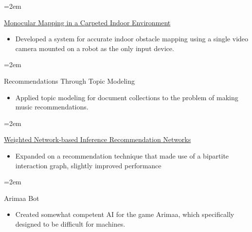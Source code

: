 \documentclass[a4paper]{scrartcl}
\newcommand{\NewSectionHeading}[1]{\noindent\color{blue}\spacedlowsmallcaps{#1}\vspace{1em}\color{Black}} %
\newcommand{\Description}[1]{\hangindent=2em\hangafter=0\noindent\raggedright\footnotesize{#1}\par\normalsize\vspace{1em}} %
\begin{document}
\begin{cv}{}

\NewSectionHeading{Cool Projects}

\Description{\href{http://www.cs.cornell.edu/Courses/cs4758/2013sp/final\%20project/hung_dang.pdf}{Monocular Mapping in a Carpeted Indoor Environment}
\begin{itemize}
\newcommand{\localtextbulletone}{\textcolor{blue}{\raisebox{0.40ex}{\rule{.6ex}{.6ex}}}}
\renewcommand{\labelitemi}{\localtextbulletone}
    \item Developed a system for accurate indoor obstacle mapping using a single video camera mounted on a robot as the only input device.
\end{itemize}}

\vspace{-0.5em} %

\Description{Recommendations Through Topic Modeling
\begin{itemize}
\newcommand{\localtextbulletone}{\textcolor{blue}{\raisebox{0.40ex}{\rule{.6ex}{.6ex}}}}
\renewcommand{\labelitemi}{\localtextbulletone}
    \item Applied topic modeling for document collections to the problem of making music recommendations.
\end{itemize}}

\vspace{-0.5em} %

\Description{\href{http://sohanjain.com/portfolio/jain-terkelsen-hundal-network-based-inference/}{Weighted Network-based Inference Recommendation Networks}
\begin{itemize}
\newcommand{\localtextbulletone}{\textcolor{blue}{\raisebox{0.40ex}{\rule{.6ex}{.6ex}}}}
\renewcommand{\labelitemi}{\localtextbulletone}
    \item Expanded on a recommendation technique that made use of a bipartite interaction graph, slightly improved performance
\end{itemize}}

\vspace{-0.5em} %

\Description{Arimaa Bot
\begin{itemize}
\newcommand{\localtextbulletone}{\textcolor{blue}{\raisebox{0.40ex}{\rule{.6ex}{.6ex}}}}
\renewcommand{\labelitemi}{\localtextbulletone}
    \item Created somewhat competent AI for the game Arimaa, which specifically designed to be difficult for machines.
\end{itemize}}


\end{cv}
\end{document}
